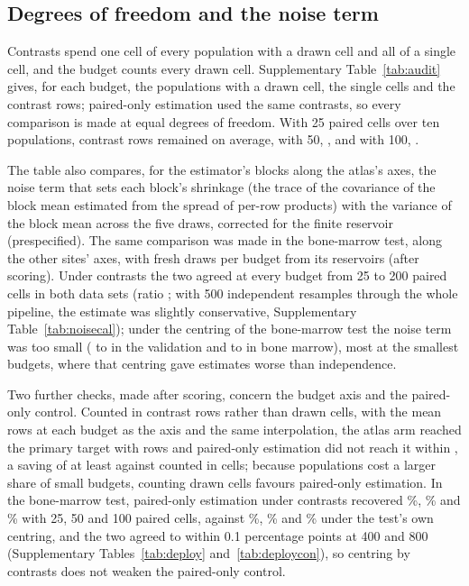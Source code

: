 \subsection*{Degrees of freedom and the noise term}
Contrasts spend one cell of every population with a drawn cell and all of a single cell, and the budget counts every drawn cell. Supplementary Table~\ref{tab:audit} gives, for each budget, the populations with a drawn cell, the single cells and the contrast rows; paired-only estimation used the same contrasts, so every comparison is made at equal degrees of freedom. With 25 paired cells over ten populations, \VlRowsTwentyFive{} contrast rows remained on average, with 50, \VlRowsFifty, and with 100, \VlRowsHundred.

The table also compares, for the estimator's blocks along the atlas's axes, the noise term that sets each block's shrinkage (the trace of the covariance of the block mean estimated from the spread of per-row products) with the variance of the block mean across the five draws, corrected for the finite reservoir (prespecified). The same comparison was made in the bone-marrow test, along the other sites' axes, with \DpCalDraws{} fresh draws per budget from its reservoirs (after scoring). Under contrasts the two agreed at every budget from 25 to 200 paired cells in both data sets (ratio \CalCon; with 500 independent resamples through the whole pipeline, the estimate was slightly conservative, Supplementary Table~\ref{tab:noisecal}); under the centring of the bone-marrow test the noise term was too small (\VlCalDfMin{} to \VlCalDfMax{} in the validation and \DpCalDfMin{} to \DpCalDfMax{} in bone marrow), most at the smallest budgets, where that centring gave estimates worse than independence.

Two further checks, made after scoring, concern the budget axis and the paired-only control. Counted in contrast rows rather than drawn cells, with the mean rows at each budget as the axis and the same interpolation, the atlas arm reached the primary target with \VlRowsAtlas{} rows and paired-only estimation did not reach it within \VlRowsMax, a saving of at least \VlSaveAtlasRows{} against \VlSaveAtlas{} counted in cells; because populations cost a larger share of small budgets, counting drawn cells favours paired-only estimation. In the bone-marrow test, paired-only estimation under contrasts recovered \DpPoConTwentyFive\%, \DpPoConFifty\% and \DpPoConHundred\% with 25, 50 and 100 paired cells, against \DpPoDfTwentyFive\%, \DpPoDfFifty\% and \DpPoDfHundred\% under the test's own centring, and the two agreed to within 0.1 percentage points at 400 and 800 (Supplementary Tables~\ref{tab:deploy} and~\ref{tab:deploycon}), so centring by contrasts does not weaken the paired-only control.

